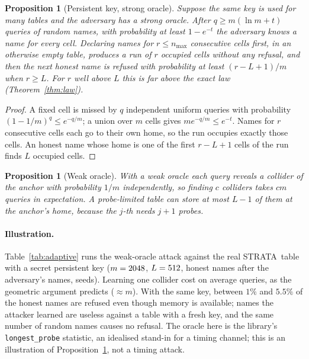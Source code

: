 \documentclass[11pt,a4paper]{article}
\newtheorem{proposition}[theorem]{Proposition}
\theoremstyle{definition}
\theoremstyle{remark}
\newcommand{\st}{STRATA}
\newcommand{\code}[1]{\texttt{#1}}
\begin{document}
\begin{proposition}[Persistent key, strong oracle]\label{prop:persist}
Suppose the same key is used for many tables and the adversary has a strong oracle. After $q\ge m(\ln m+t)$ queries of random names, with probability at least $1-e^{-t}$ the adversary knows a name for every cell. Declaring names for $r\le n_{\max}$ consecutive cells first, in an otherwise empty table, produces a run of $r$ occupied cells without any refusal, and then the next honest name is refused with probability at least $(r-L+1)/m$ when $r\ge L$. For $r$ well above $L$ this is far above the exact law (Theorem~\ref{thm:law}).
\end{proposition}
\begin{proof}
A fixed cell is missed by $q$ independent uniform queries with probability $(1-1/m)^q\le e^{-q/m}$; a union over $m$ cells gives $me^{-q/m}\le e^{-t}$. Names for $r$ consecutive cells each go to their own home, so the run occupies exactly those cells. An honest name whose home is one of the first $r-L+1$ cells of the run finds $L$ occupied cells.
\end{proof}

\begin{proposition}[Weak oracle]\label{prop:weak}
With a weak oracle each query reveals a collider of the anchor with probability $1/m$ independently, so finding $c$ colliders takes $cm$ queries in expectation. A probe-limited table can store at most $L-1$ of them at the anchor's home, because the $j$-th needs $j+1$ probes.
\end{proposition}

\paragraph{Illustration.} Table~\ref{tab:adaptive} runs the weak-oracle attack against the real \st\ table with a secret persistent key ($m=2048$, $L=512$, \AdHonest{} honest names after the adversary's names, \AdSeeds{} seeds). Learning one collider cost on average \AdQueries{} queries, as the geometric argument predicts ($\approx m$). With the same key, between $1\%$ and $5.5\%$ of the honest names are refused even though memory is available; names the attacker learned are useless against a table with a fresh key, and the same number of random names causes no refusal. The oracle here is the library's \code{longest\_probe} statistic, an idealised stand-in for a timing channel; this is an illustration of Proposition~\ref{prop:weak}, not a timing attack.
\end{document}
